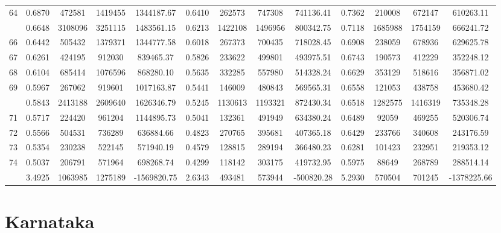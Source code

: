 \documentclass[
  12pt,
]{article}
\begin{document}
\begin{longtable}[t]{lcccccccccccc}
64 & 0.6870 & 472581 & 1419455 & 1344187.67 & 0.6410 & 262573 & 747308 & 741136.41 & 0.7362 & 210008 & 672147 & 610263.11\\
\addlinespace
65 & 0.6648 & 3108096 & 3251115 & 1483561.15 & 0.6213 & 1422108 & 1496956 & 800342.75 & 0.7118 & 1685988 & 1754159 & 666241.72\\
66 & 0.6442 & 505432 & 1379371 & 1344777.58 & 0.6018 & 267373 & 700435 & 718028.45 & 0.6908 & 238059 & 678936 & 629625.78\\
67 & 0.6261 & 424195 & 912030 & 839465.37 & 0.5826 & 233622 & 499801 & 493975.51 & 0.6743 & 190573 & 412229 & 352248.12\\
68 & 0.6104 & 685414 & 1076596 & 868280.10 & 0.5635 & 332285 & 557980 & 514328.24 & 0.6629 & 353129 & 518616 & 356871.02\\
69 & 0.5967 & 267062 & 919601 & 1017163.87 & 0.5441 & 146009 & 480843 & 569565.31 & 0.6558 & 121053 & 438758 & 453680.42\\
\addlinespace
70 & 0.5843 & 2413188 & 2609640 & 1626346.79 & 0.5245 & 1130613 & 1193321 & 872430.34 & 0.6518 & 1282575 & 1416319 & 735348.28\\
71 & 0.5717 & 224420 & 961204 & 1144895.73 & 0.5041 & 132361 & 491949 & 634380.24 & 0.6489 & 92059 & 469255 & 520306.74\\
72 & 0.5566 & 504531 & 736289 & 636884.66 & 0.4823 & 270765 & 395681 & 407365.18 & 0.6429 & 233766 & 340608 & 243176.59\\
73 & 0.5354 & 230238 & 522145 & 571940.19 & 0.4579 & 128815 & 289194 & 366480.23 & 0.6281 & 101423 & 232951 & 219353.12\\
74 & 0.5037 & 206791 & 571964 & 698268.74 & 0.4299 & 118142 & 303175 & 419732.95 & 0.5975 & 88649 & 268789 & 288514.14\\
\addlinespace
75 & 3.4925 & 1063985 & 1275189 & -1569820.75 & 2.6343 & 493481 & 573944 & -500820.28 & 5.2930 & 570504 & 701245 & -1378225.66\\*
\end{longtable}
\endgroup{}

\pagebreak

\hypertarget{karnataka}{%
\section{Karnataka}\label{karnataka}}

\begingroup\fontsize{9.7}{11.7}\selectfont
\end{document}
